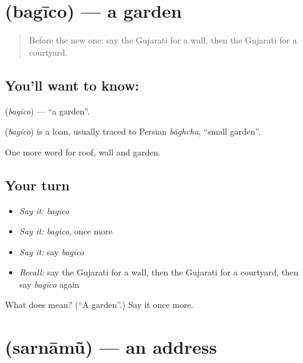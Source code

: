 \section[\texorpdfstring{\gu{બગીચો} (bagīco)}{બગીચો (bagīco)}]{ (bagīco) — a garden}

\label{lesson:GU-C63-garden}



\begin{quote}
Before the new one: say the Gujarati for a wall, then the Gujarati for a courtyard.
\end{quote}

\subsection*{You'll want to know: }
\textbf{} (\emph{bagīco}) — \textquotedblleft{}a garden\textquotedblright{}.

\begin{cousinweb}
\textbf{} (\emph{bagīco}) is a loan, usually traced to Persian \emph{bāghcha}, \textquotedblleft{}small garden\textquotedblright{}.
\end{cousinweb}

\begin{grammarlens}[title={What you've built}]
One more word for roof, wall and garden.
\end{grammarlens}

\subsection*{Your turn}
\begin{itemize}
\raggedright
  \item \emph{Say it:} \emph{bagīco}
  \item \emph{Say it:} \emph{bagīco}, once more
  \item \emph{Say it:} say \emph{bagīco}
  \item \emph{Recall:} say the Gujarati for a wall, then the Gujarati for a courtyard, then say \emph{bagīco} again
\end{itemize}

\begin{tcolorbox}[breakable,colback=teal!4,colframe=teal!35!black,title={Before you move on}]
What does  mean? (\textquotedblleft{}A garden\textquotedblright{}.) Say it once more.
\end{tcolorbox}
\section[\texorpdfstring{\gu{સરનામું} (sarnāmũ)}{સરનામું (sarnāmũ)}]{ (sarnāmũ) — an address}

